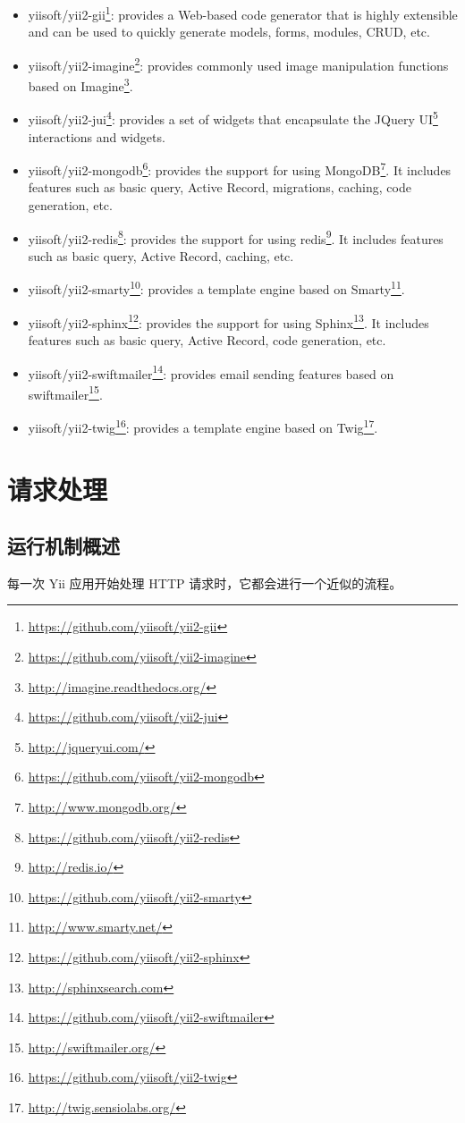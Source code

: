 \begin{itemize}
\item yiisoft/yii2-gii\footnote{\url{https://github.com/yiisoft/yii2-gii}}:
provides a Web-based code generator that is highly extensible and can be used to quickly generate models,
forms, modules, CRUD, etc.
\item yiisoft/yii2-imagine\footnote{\url{https://github.com/yiisoft/yii2-imagine}}:
provides commonly used image manipulation functions based on Imagine\footnote{\url{http://imagine.readthedocs.org/}}.
\item yiisoft/yii2-jui\footnote{\url{https://github.com/yiisoft/yii2-jui}}:
provides a set of widgets that encapsulate the JQuery UI\footnote{\url{http://jqueryui.com/}} interactions and widgets.
\item yiisoft/yii2-mongodb\footnote{\url{https://github.com/yiisoft/yii2-mongodb}}:
provides the support for using MongoDB\footnote{\url{http://www.mongodb.org/}}. It includes features such as basic query,
Active Record, migrations, caching, code generation, etc.
\item yiisoft/yii2-redis\footnote{\url{https://github.com/yiisoft/yii2-redis}}:
provides the support for using redis\footnote{\url{http://redis.io/}}. It includes features such as basic query,
Active Record, caching, etc.
\item yiisoft/yii2-smarty\footnote{\url{https://github.com/yiisoft/yii2-smarty}}:
provides a template engine based on Smarty\footnote{\url{http://www.smarty.net/}}.
\item yiisoft/yii2-sphinx\footnote{\url{https://github.com/yiisoft/yii2-sphinx}}:
provides the support for using Sphinx\footnote{\url{http://sphinxsearch.com}}. It includes features such as basic query,
Active Record, code generation, etc.
\item yiisoft/yii2-swiftmailer\footnote{\url{https://github.com/yiisoft/yii2-swiftmailer}}:
provides email sending features based on swiftmailer\footnote{\url{http://swiftmailer.org/}}.
\item yiisoft/yii2-twig\footnote{\url{https://github.com/yiisoft/yii2-twig}}:
provides a template engine based on Twig\footnote{\url{http://twig.sensiolabs.org/}}.
\end{itemize}


\chapter{请求处理}
\label{runtime-overview.md}\section{运行机制概述}
每一次 Yii 应用开始处理 HTTP 请求时，它都会进行一个近似的流程。


